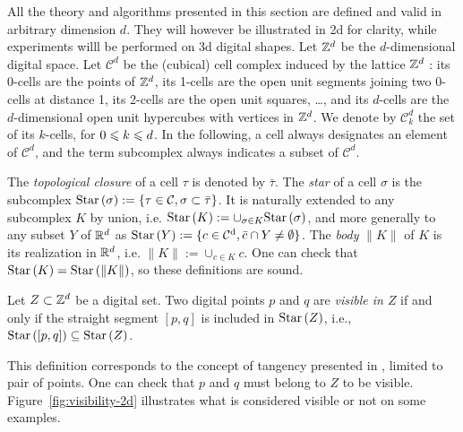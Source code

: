     All the theory and algorithms presented in this section are
    defined and valid in arbitrary dimension $d$. They will however be
    illustrated in 2d for clarity, while experiments willl be
    performed on 3d digital shapes.  Let $\mathbb{Z}^d$ be the $d$-dimensional
    digital space.  Let $\mathcal{C}^d$ be the (cubical) cell complex
    induced by the lattice $\mathbb{Z}^d$ : its 0-cells are the points of
    $\mathbb{Z}^d$, its 1-cells are the open unit segments joining two 0-cells
    at distance 1, its 2-cells are the open unit squares, \ldots, and
    its $d$-cells are the $d$-dimensional open unit hypercubes with
    vertices in $\mathbb{Z}^d$.  We denote by $\mathcal{C}^d_k$ the set of its
    $k$-cells, for $0 \leqslant k \leqslant d$.  In the following, a cell always
    designates an element of $\mathcal{C}^d$, and the term subcomplex
    always indicates a subset of $\mathcal{C}^d$.

    The \emph{topological closure} of a cell $\tau$ is denoted by
    $\bar{\tau}$. The \emph{star} of a cell $\sigma$ is the subcomplex
    $\mathrm{Star}\left(\sigma\right):=\{\tau \in \mathcal{C}, \sigma \subset \bar{\tau}
    \}$. It is naturally extended to any subcomplex $K$ by union,
    i.e. $\mathrm{Star}\left(K\right) := \cup_{\sigma \in K} \mathrm{Star}\left(\sigma\right)$, and more
    generally to any subset $Y$ of $\mathbb{R}^d$ as $\mathrm{Star}\left(Y\right):=\{ c \in \operatorname{\mathcal{C}^d},
    \bar{c} \cap Y \neq \emptyset \}$. The \emph{body} $\|K\|$ of $K$
    is its realization in $\mathbb{R}^d$, i.e. $\|K\|:=\cup_{c \in K} c$. One
    can check that $\mathrm{Star}\left(K\right)=\mathrm{Star}\left(\|K\|\right)$, so these definitions are
    sound.

    \begin{definition}[Visibility]
      Let $Z \subset \mathbb{Z}^d$ be a digital set. Two digital points $p$
      and $q$ are \emph{visible in $Z$} if and only if the straight
      segment $[p, q]$ is included in $\mathrm{Star}\left(Z\right)$, i.e., $\mathrm{Star}\left([p, q]\right)
      \subseteq \mathrm{Star}\left(Z\right)$.
    \end{definition}
    This definition corresponds to the concept of tangency presented
    in \cite{lachaud:2022-jmiv}, limited to pair of points. One can
    check that $p$ and $q$ must belong to $Z$ to be visible.
    Figure~\ref{fig:visibility-2d} illustrates what is considered
    visible or not on some examples.

